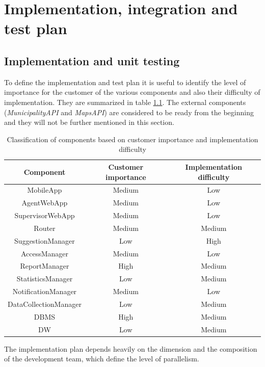 \documentclass[a4paper]{report}
\begin{document}
\chapter{Implementation, integration and test plan}
\section{Implementation and unit testing}
To define the implementation and test plan it is useful to identify the level of importance for the customer of the various components and also their difficulty of implementation. They are summarized in table \ref{tab-testing}. The external components (\textit{MunicipalityAPI} and \textit{MapsAPI}) are considered to be ready from the beginning and they will not be further mentioned in this section.\\
\begin{table}[H]  
  \centering
  \bgroup
  \def\arraystretch{1.5}%
  \begin{tabular}{|c|c|c|}
    \cline{1-3}
    \textbf{Component} & \textbf{Customer importance} & \textbf{Implementation difficulty} \\ \hline
    MobileApp & Medium & Low   \\ \hline
    AgentWebApp & Medium & Low   \\ \hline
    SupervisorWebApp & Medium & Low   \\ \hline
    Router & Medium & Medium   \\ \hline
    SuggestionManager & Low & High   \\ \hline
    AccessManager & Medium & Low   \\ \hline
    ReportManager & High & Medium   \\ \hline
    StatisticsManager & Low & Medium   \\ \hline
    NotificationManager & Medium & Low   \\ \hline
    DataCollectionManager & Low & Medium   \\ \hline
    DBMS & High & Medium   \\ \hline
    DW & Low & Medium   \\ \hline
    
  \end{tabular}
  \egroup
  \caption{Classification of components based on customer importance and implementation difficulty}
  \label{tab-testing}
\end{table}
The implementation plan depends heavily on the dimension and the composition of the development team, which define the level of parallelism.
\end{document}

